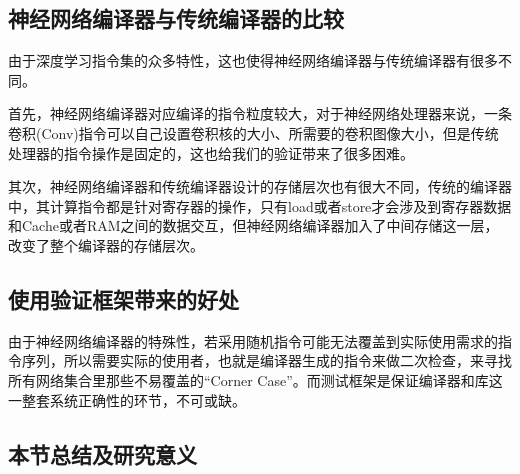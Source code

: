 \subsection{神经网络编译器与传统编译器的比较}
由于深度学习指令集的众多特性，这也使得神经网络编译器与传统编译器有很多不同。

首先，神经网络编译器对应编译的指令粒度较大，对于神经网络处理器来说，一条卷积(Conv)指令可以自己设置卷积核的大小、所需要的卷积图像大小，但是传统处理器的指令操作是固定的，这也给我们的验证带来了很多困难。

其次，神经网络编译器和传统编译器设计的存储层次也有很大不同，传统的编译器中，其计算指令都是针对寄存器的操作，只有load或者store才会涉及到寄存器数据和Cache或者RAM之间的数据交互，但神经网络编译器加入了中间存储这一层，改变了整个编译器的存储层次。

\subsection{使用验证框架带来的好处}
由于神经网络编译器的特殊性，若采用随机指令可能无法覆盖到实际使用需求的指令序列，所以需要实际的使用者，也就是编译器生成的指令来做二次检查，来寻找所有网络集合里那些不易覆盖的“Corner Case”。而测试框架是保证编译器和库这一整套系统正确性的环节，不可或缺。

\subsection{本节总结及研究意义}
